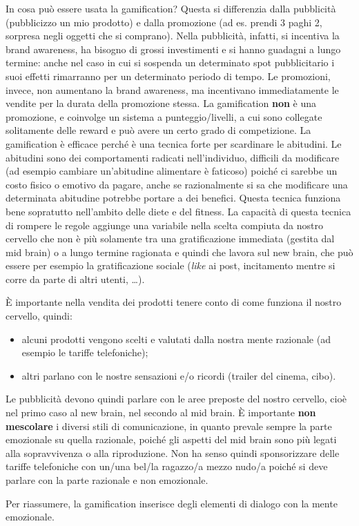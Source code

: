 In cosa può essere usata la gamification? Questa si differenzia dalla
pubblicità (pubblicizzo un mio prodotto) e dalla promozione (ad es. prendi 3
paghi 2, sorpresa negli oggetti che si comprano). Nella pubblicità, infatti, si
incentiva la brand awareness, ha bisogno di grossi investimenti e si hanno
guadagni a lungo termine: anche nel caso in cui si sospenda un determinato spot
pubblicitario i suoi effetti rimarranno per un determinato periodo di tempo. Le
promozioni, invece, non aumentano la brand awareness, ma incentivano
immediatamente le vendite per la durata della promozione stessa. La
gamification \textbf{non} è una promozione, e coinvolge un sistema a
punteggio/livelli, a cui sono collegate solitamente delle reward e può avere un
certo grado di competizione.
La gamification è efficace perché è una tecnica forte per scardinare le
abitudini. Le abitudini sono dei comportamenti radicati nell'individuo,
difficili da modificare (ad esempio cambiare un'abitudine alimentare è
faticoso) poiché ci sarebbe un costo fisico o emotivo da pagare, anche se
razionalmente si sa che modificare una determinata abitudine potrebbe portare a
dei benefici. Questa tecnica funziona bene sopratutto nell'ambito delle diete e
del fitness. La capacità di questa tecnica di rompere le regole aggiunge una
variabile nella scelta compiuta da nostro cervello che non è più solamente tra
una gratificazione immediata (gestita dal mid brain) o a lungo termine 
ragionata e quindi che lavora sul new brain, che può essere per esempio la
gratificazione sociale (\emph{like} ai post, incitamento mentre si corre da
parte di altri utenti, \dots{}).

È importante nella vendita dei prodotti tenere conto di come funziona il nostro
cervello, quindi:
\begin{itemize}
 \item alcuni prodotti vengono scelti e valutati dalla nostra mente razionale
 (ad esempio le tariffe telefoniche);
 \item altri parlano con le nostre sensazioni e/o ricordi (trailer del cinema,
 cibo).
\end{itemize}

Le pubblicità devono quindi parlare con le aree preposte del nostro cervello,
cioè nel primo caso al new brain, nel secondo al mid brain. È importante
\textbf{non mescolare} i diversi stili di comunicazione, in quanto prevale
sempre la parte emozionale su quella razionale, poiché gli aspetti del mid
brain sono più legati alla sopravvivenza o alla riproduzione. Non ha senso
quindi sponsorizzare delle tariffe telefoniche con un/una bel/la ragazzo/a
mezzo nudo/a poiché si deve parlare con la parte razionale e non emozionale.

Per riassumere, la gamification inserisce degli elementi di dialogo
con la mente emozionale.
